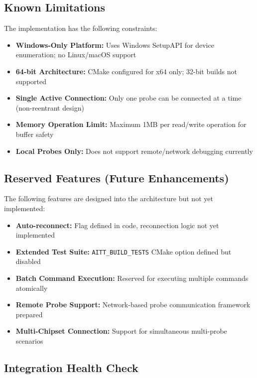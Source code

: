 \documentclass[12pt,a4paper]{article}
\begin{document}
\subsection{Known Limitations}

The implementation has the following constraints:

\begin{itemize}
    \item \textbf{Windows-Only Platform:} Uses Windows SetupAPI for device enumeration; no Linux/macOS support
    \item \textbf{64-bit Architecture:} CMake configured for x64 only; 32-bit builds not supported
    \item \textbf{Single Active Connection:} Only one probe can be connected at a time (non-reentrant design)
    \item \textbf{Memory Operation Limit:} Maximum 1MB per read/write operation for buffer safety
    \item \textbf{Local Probes Only:} Does not support remote/network debugging currently
\end{itemize}

\subsection{Reserved Features (Future Enhancements)}

The following features are designed into the architecture but not yet implemented:

\begin{itemize}
    \item \textbf{Auto-reconnect:} Flag defined in code, reconnection logic not yet implemented
    \item \textbf{Extended Test Suite:} \texttt{AITT\_BUILD\_TESTS} CMake option defined but disabled
    \item \textbf{Batch Command Execution:} Reserved for executing multiple commands atomically
    \item \textbf{Remote Probe Support:} Network-based probe communication framework prepared
    \item \textbf{Multi-Chipset Connection:} Support for simultaneous multi-probe scenarios
\end{itemize}

\subsection{Integration Health Check}
\end{document}
